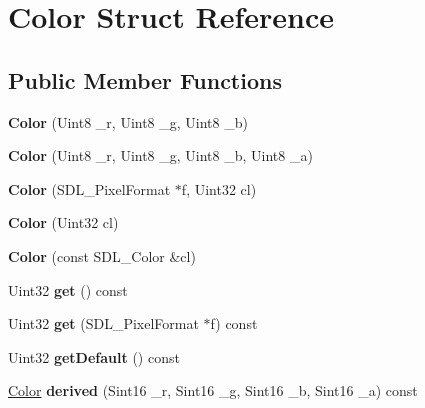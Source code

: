 \hypertarget{struct_color}{
\section{Color Struct Reference}
\label{struct_color}
}
\subsection*{Public Member Functions}
\begin{DoxyCompactItemize}
\item 
\hypertarget{struct_color_aa3d3ad01b54836b97e74a13307da0af4}{
{\bfseries Color} (Uint8 \_\-r, Uint8 \_\-g, Uint8 \_\-b)}
\label{struct_color_aa3d3ad01b54836b97e74a13307da0af4}

\item 
\hypertarget{struct_color_a9c382889b86a7fce07119c29346f3319}{
{\bfseries Color} (Uint8 \_\-r, Uint8 \_\-g, Uint8 \_\-b, Uint8 \_\-a)}
\label{struct_color_a9c382889b86a7fce07119c29346f3319}

\item 
\hypertarget{struct_color_a8464ce5123f09ffca1c2f2936c13837a}{
{\bfseries Color} (SDL\_\-PixelFormat $\ast$f, Uint32 cl)}
\label{struct_color_a8464ce5123f09ffca1c2f2936c13837a}

\item 
\hypertarget{struct_color_a5e8ac089b599763104572dac6a29a2d5}{
{\bfseries Color} (Uint32 cl)}
\label{struct_color_a5e8ac089b599763104572dac6a29a2d5}

\item 
\hypertarget{struct_color_aa7fe48cbdd5372493cb74c20ba9bafe3}{
{\bfseries Color} (const SDL\_\-Color \&cl)}
\label{struct_color_aa7fe48cbdd5372493cb74c20ba9bafe3}

\item 
\hypertarget{struct_color_a6d5cc100f9be7f452c9dcb4e3d47c5df}{
Uint32 {\bfseries get} () const }
\label{struct_color_a6d5cc100f9be7f452c9dcb4e3d47c5df}

\item 
\hypertarget{struct_color_ae34de698b1e77c466846341b5594b53a}{
Uint32 {\bfseries get} (SDL\_\-PixelFormat $\ast$f) const }
\label{struct_color_ae34de698b1e77c466846341b5594b53a}

\item 
\hypertarget{struct_color_af96d37a49c93381771e8fd84e0ee66c1}{
Uint32 {\bfseries getDefault} () const }
\label{struct_color_af96d37a49c93381771e8fd84e0ee66c1}

\item 
\hypertarget{struct_color_af3e9c5f3b0e33205f40c5191882107f9}{
\hyperlink{struct_color}{Color} {\bfseries derived} (Sint16 \_\-r, Sint16 \_\-g, Sint16 \_\-b, Sint16 \_\-a) const }
\label{struct_color_af3e9c5f3b0e33205f40c5191882107f9}


\end{DoxyCompactItemize}
